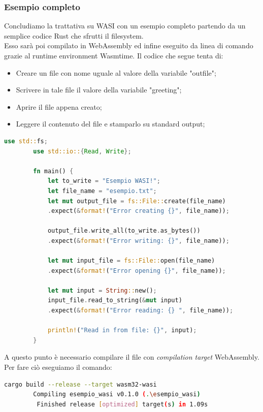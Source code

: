 \subsubsection{Esempio completo}
Concludiamo la trattativa su WASI con un esempio completo partendo da un semplice codice Rust che sfrutti il filesystem.
\\Esso sarà poi compilato in WebAssembly ed infine eseguito da linea di comando grazie al runtime environment Wasmtime.
Il codice che segue tenta di:
\begin{itemize}
        \item Creare un file con nome uguale al valore della variabile "outfile";
        \item Scrivere in tale file il valore della variabile "greeting";
        \item Aprire il file appena creato;
        \item Leggere il contenuto del file e stamparlo su standard output;
\end{itemize}
\begin{lstlisting}[language=rust, label=lst:RustWasi, caption={Esempio in Rust}, showstringspaces=false]
        use std::fs;
        use std::io::{Read, Write};
                
        fn main() {
            let to_write = "Esempio WASI!";
            let file_name = "esempio.txt";
            let mut output_file = fs::File::create(file_name)
            .expect(&format!("Error creating {}", file_name));

            output_file.write_all(to_write.as_bytes())
            .expect(&format!("Error writing: {}", file_name));
        
            let mut input_file = fs::File::open(file_name)
            .expect(&format!("Error opening {}", file_name));
        
            let mut input = String::new();
            input_file.read_to_string(&mut input)
            .expect(&format!("Error reading: {} ", file_name));
        
            println!("Read in from file: {}", input);
        }
\end{lstlisting}
A questo punto è necessario compilare il file con \emph{compilation target} WebAssembly. Per fare ciò eseguiamo il comando:
\begin{lstlisting}[language=Bash, numbers=none]
cargo build --release --target wasm32-wasi
        Compiling esempio_wasi v0.1.0 (.\esempio_wasi)
         Finished release [optimized] target(s) in 1.09s
\end{lstlisting}
